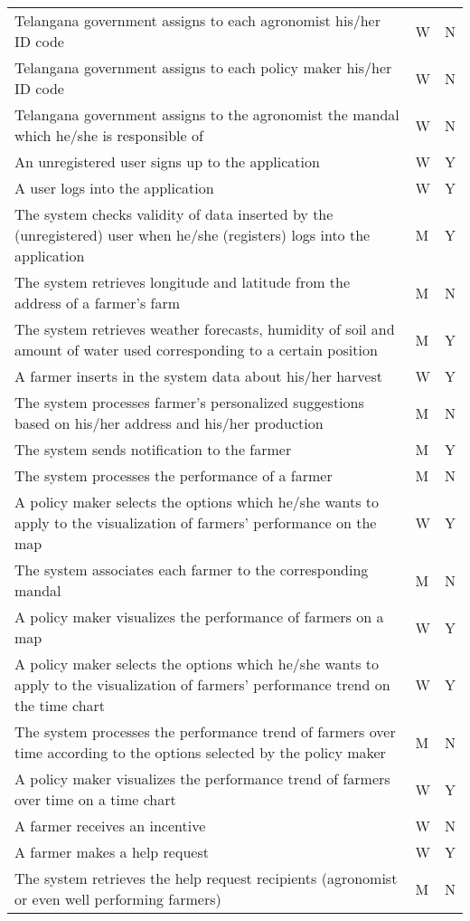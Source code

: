 \begin{center}
\begin{longtable}{ |m{7cm}|C{2.3cm}|C{1.6cm}|}
Telangana government assigns to each agronomist his/her ID code & W & N\\
Telangana government assigns to each policy maker his/her ID code & W & N\\
Telangana government assigns to the agronomist the mandal which he/she is responsible of & W & N\\
An unregistered user signs up to the application & W & Y\\
A user logs into the application & W & Y\\
The system checks validity of data inserted by the (unregistered) user when he/she (registers) logs into the application & M & Y\\
The system retrieves longitude and latitude from the address of a farmer's farm & M & N\\
The system retrieves weather forecasts, humidity of soil and amount of water used corresponding to a certain position & M & Y\\
A farmer inserts in the system data about his/her harvest & W & Y\\
The system processes farmer's personalized suggestions based on his/her address and his/her production & M & N\\
The system sends notification to the farmer & M & Y\\
The system processes the performance of a farmer & M & N\\
A policy maker selects the options which he/she wants to apply to the visualization of farmers' performance on the map & W & Y\\
The system associates each farmer to the corresponding mandal & M & N\\
A policy maker visualizes the performance of farmers on a map & W & Y\\
A policy maker selects the options which he/she wants to apply to the visualization of farmers' performance trend on the time chart & W & Y\\
The system processes the performance trend of farmers over time according to the options selected by the policy maker & M & N\\
A policy maker visualizes the performance trend of farmers over time on a time chart & W & Y\\
A farmer receives an incentive & W & N\\
A farmer makes a help request & W & Y\\
The system retrieves the help request recipients (agronomist or even well performing farmers) & M & N\\

\end{longtable}
\end{center}
